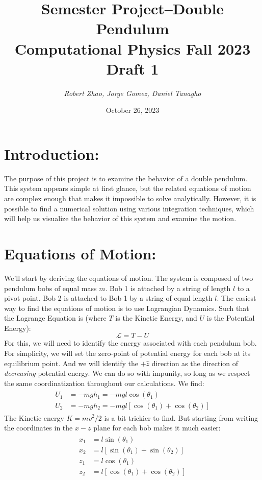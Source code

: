 \documentclass{article}
\title{Semester Project--Double Pendulum \\Computational Physics Fall 2023 \\Draft 1}
\author{\textit{Robert Zhao, Jorge Gomez, Daniel Tanagho}}
\date{October 26, 2023}
\begin{document}
\maketitle

\section*{Introduction:}
The purpose of this project is to examine the behavior of a double pendulum. This system appears simple at first glance, but the related equations of motion are complex enough that makes it impossible to solve analytically. However, it is possible to find a numerical solution using various integration techniques, which will help us visualize the behavior of this system and examine the motion.

\section{Equations of Motion:}
We'll start by deriving the equations of motion. The system is composed of two pendulum bobs of equal mass $m$. Bob 1 is attached by a string of length $l$ to a pivot point. Bob 2 is attached to Bob 1 by a string of equal length $l$. The easiest way to find the equations of motion is to use Lagrangian Dynamics. Such that the Lagrange Equation is (where $T$ is the Kinetic Energy, and $U$ is the Potential Energy):
\begin{equation}
    \mathcal{L} = T - U
\end{equation}
For this, we will need to identify the energy associated with each pendulum bob. For simplicity, we will set the zero-point of potential energy for each bob at its equilibrium point. And we will identify the $+\hat{z}$ direction as the direction of \textit{decreasing} potential energy. We can do so with impunity, so long as we respect the same coordinatization throughout our calculations. We find:
\begin{align*}
\begin{split}
    U_1 & = -mgh_1 = -mgl\cos(\theta_1) \\
    U_2 & = -mgh_2 = -mgl[\cos(\theta_1)+\cos(\theta_2)]
\end{split}
\end{align*}
The Kinetic energy $K = mv^2/2$ is a bit trickier to find. But starting from writing the coordinates in the $x-z$ plane for each bob makes it much easier:
\begin{align*}
\begin{split}
    x_1 & = l\sin(\theta_1) \\
    x_2 & = l[\sin(\theta_1)+\sin(\theta_2)] \\
    z_1 & = l\cos(\theta_1) \\
    z_2 & = l[\cos(\theta_1)+\cos(\theta_2)]
\end{split}
\end{align*}
\end{document}
